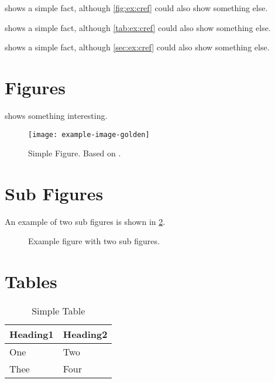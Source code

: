 \documentclass[
  numbers=noenddot,
  english,  %
  a4paper,  %
  twoside,  %
  bibliography=totoc,
  headsepline,
  cleardoublepage=empty,
  parskip=half,
  draft=false
]{scrbook}
\theoremstyle{break}
\begin{document}
\begin{ltgexample}
 shows a simple fact, although \cref{fig:ex:cref} could also show something else.

 shows a simple fact, although \cref{tab:ex:cref} could also show something else.

 shows a simple fact, although \cref{sec:ex:cref} could also show something else.
\end{ltgexample}

\section{Figures}

\begin{ltgexample}
 shows something interesting.

\begin{figure}
  \centering
  \texttt{[image: example-image-golden]}
  \caption[Simple Figure]{
    Simple Figure.
    Based on \citet{mwe}.
  }
  \label{fig:label}
\end{figure}
\end{ltgexample}

\section{Sub Figures}

An example of two sub figures is shown in \cref{fig:two_sub_figures}.

\begin{ltgexample}
\begin{figure}[!b]
  \centering
  \hfil
  \caption{Example figure with two sub figures.}
  \label{fig:two_sub_figures}
\end{figure}
\end{ltgexample}

\section{Tables}

\begin{ltgexample}
\begin{table}
  \caption{Simple Table}
  \label{tab:simple}
  \centering
  \begin{tabular}{ll}
    \toprule
    Heading1 & Heading2 \\
    \midrule
    One      & Two      \\
    Thee     & Four     \\
    \bottomrule
  \end{tabular}
\end{table}
\end{ltgexample}
\end{document}
